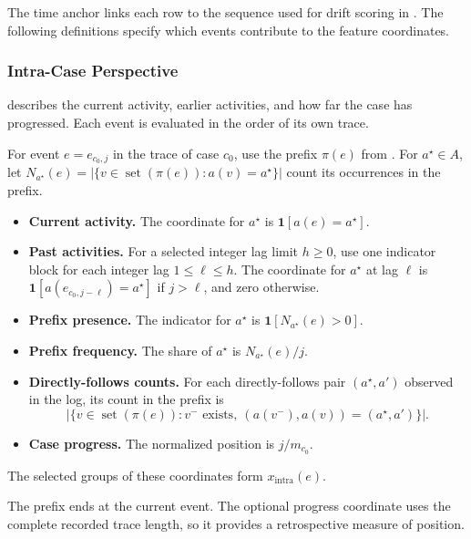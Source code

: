 The time anchor links each row to the sequence used for drift scoring in . The following definitions specify which events contribute to the feature coordinates.

\subsubsection{Intra-Case Perspective}

 describes the current activity, earlier activities, and how far the case has progressed. Each event is evaluated in the order of its own trace.

\begin{Definition}\label{def:intra-features}
For event $e=e_{c_0,j}$ in the trace of case $c_0$, use the prefix $\pi(e)$ from . For $a^\star\in A$, let $N_{a^\star}(e)=|\{v\in\operatorname{set}(\pi(e)):a(v)=a^\star\}|$ count its occurrences in the prefix.
\begin{itemize}
  \item \textbf{Current activity.} The coordinate for $a^\star$ is $\mathbf{1}[a(e)=a^\star]$.
  \item \textbf{Past activities.} For a selected integer lag limit $h\geq0$, use one indicator block for each integer lag $1\leq\ell\leq h$. The coordinate for $a^\star$ at lag $\ell$ is $\mathbf{1}[a(e_{c_0,j-\ell})=a^\star]$ if $j>\ell$, and zero otherwise.
  \item \textbf{Prefix presence.} The indicator for $a^\star$ is $\mathbf{1}[N_{a^\star}(e)>0]$.
  \item \textbf{Prefix frequency.} The share of $a^\star$ is $N_{a^\star}(e)/j$.
  \item \textbf{Directly-follows counts.} For each directly-follows pair $(a^\star,a')$ observed in the log, its count in the prefix is
  \[
    \bigl|\{v\in\operatorname{set}(\pi(e)):v^-\text{ exists},\
                 (a(v^-),a(v))=(a^\star,a')\}\bigr|.
  \]
  \item \textbf{Case progress.} The normalized position is $j/m_{c_0}$.
\end{itemize}
The selected groups of these coordinates form $x_{\mathrm{intra}}(e)$.
\end{Definition}

The prefix ends at the current event. The optional progress coordinate uses the complete recorded trace length, so it provides a retrospective measure of position.

